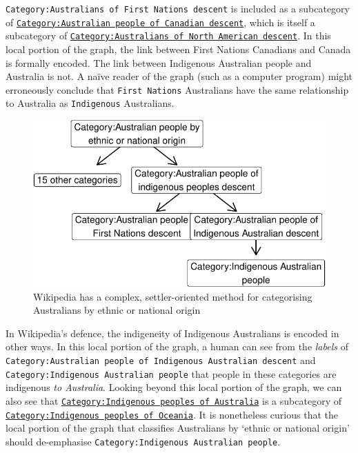 \documentclass[
  a4paper,
  DIV=11,
  numbers=noendperiod]{scrreprt}
\begin{document}
\texttt{Category:Australians\ of\ First\ Nations\ descent} is included
as a subcategory of
\href{https://en.wikipedia.org/w/index.php?title=Category:Australian_people_of_Canadian_descent\&oldid=649754186}{\texttt{Category:Australian\ people\ of\ Canadian\ descent}},
which is itself a subcategory of
\href{https://en.wikipedia.org/w/index.php?title=Category:Australian_people_of_North_American_descent\&oldid=839030224}{\texttt{Category:Australians\ of\ North\ American\ descent}}.
In this local portion of the graph, the link between First Nations
Canadians and Canada is formally encoded. The link between Indigenous
Australian people and Australia is not. A naïve reader of the graph
(such as a computer program) might erroneously conclude that
\texttt{First\ Nations} Australians have the same relationship to
Australia as \texttt{Indigenous} Australians.

\begin{figure}

{\centering \includegraphics{who-counts_files/figure-pdf/fig-ethnic-categorisation-graph-1.pdf}

}

\caption{\label{fig-ethnic-categorisation-graph}Wikipedia has a complex,
settler-oriented method for categorising Australians by ethnic or
national origin}

\end{figure}

In Wikipedia's defence, the indigeneity of Indigenous Australians is
encoded in other ways. In this local portion of the graph, a human can
see from the \emph{labels} of
\texttt{Category:Australian\ people\ of\ Indigenous\ Australian\ descent}
and \texttt{Category:Indigenous\ Australian\ people} that people in
these categories are indigenous \emph{to Australia}. Looking beyond this
local portion of the graph, we can also see that
\href{https://en.wikipedia.org/wiki/Category:Indigenous_peoples_of_Australia}{\texttt{Category:Indigenous\ peoples\ of\ Australia}}
is a subcategory of
\href{https://en.wikipedia.org/wiki/Category:Indigenous_peoples_of_Oceania}{\texttt{Category:Indigenous\ peoples\ of\ Oceania}}.
It is nonetheless curious that the local portion of the graph that
classifies Australians by `ethnic or national origin' should
de-emphasise \texttt{Category:Indigenous\ Australian\ people}.
\end{document}
